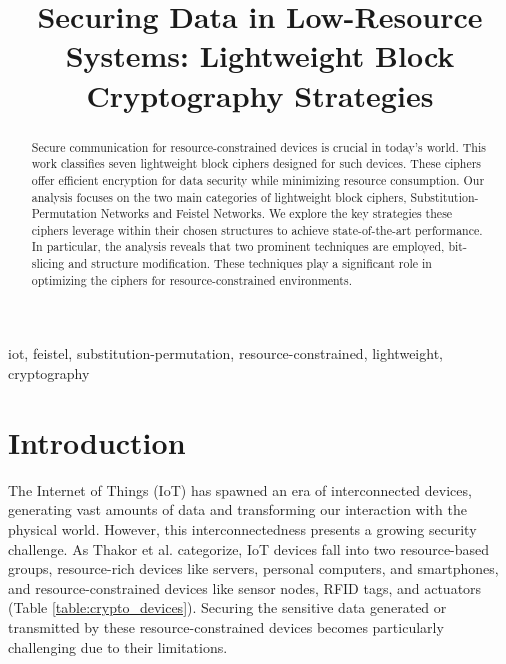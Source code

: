 \documentclass[conference]{IEEEtran}
\begin{document}
\title{Securing Data in Low-Resource Systems: Lightweight Block Cryptography Strategies}


\author{
\and
{}
}


\maketitle

\begin{abstract}
    Secure communication for resource-constrained devices is crucial in today's world. This work classifies seven lightweight block ciphers designed for such devices. These ciphers offer efficient encryption for data security while minimizing resource consumption. Our analysis focuses on the two main categories of lightweight block ciphers, Substitution-Permutation Networks and Feistel Networks. We explore the key strategies these ciphers leverage within their chosen structures to achieve state-of-the-art performance. In particular, the analysis reveals that two prominent techniques are employed, bit-slicing and structure modification. These techniques play a significant role in optimizing the ciphers for resource-constrained environments.
\end{abstract}

\begin{IEEEkeywords}
iot, feistel, substitution-permutation, resource-constrained, lightweight, cryptography
\end{IEEEkeywords}

\section{Introduction}


The Internet of Things (IoT) has spawned an era of interconnected devices, generating vast amounts of data and transforming our interaction with the physical world. However, this interconnectedness presents a growing security challenge. As Thakor et al. \cite{IoT_1} categorize, IoT devices fall into two resource-based groups, resource-rich devices like servers, personal computers, and smartphones, and resource-constrained devices like sensor nodes, RFID tags, and actuators (Table \ref{table:crypto_devices}). Securing the sensitive data generated or transmitted by these resource-constrained devices becomes particularly challenging due to their limitations.
\end{document}
